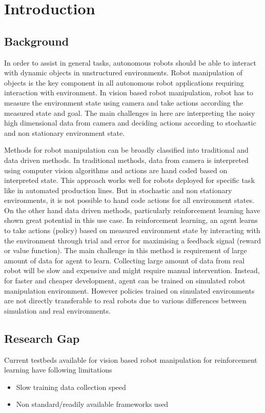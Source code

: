 \chapter{Introduction}

\section{Background}
In order to assist in general tasks, autonomous robots should be able to interact with dynamic objects in unstructured environments. Robot manipulation of objects is the key component in all autonomous robot applications requiring interaction with environment. In vision based robot manipulation, robot has to measure the environment state using camera and take actions according the measured state and goal. The main challenges in here are interpreting the noisy high dimensional data from camera and deciding actions according to stochastic and non stationary environment state.

Methods for robot manipulation can be broadly classified into traditional and data driven methods. In traditional methods, data from camera is interpreted using computer vision algorithms and actions are hand coded based on interpreted state. This approach works well for robots deployed for specific task like in automated production lines. But in stochastic and non stationary environments, it is not possible to hand code actions for all environment states. On the other hand data driven methods, particularly reinforcement learning have shown great potential in this use case. In reinforcement learning, an agent learns to take actions (policy) based on measured environment state by interacting with the environment through trial and error for maximising a feedback signal (reward or value function). The main challenge in this method is requirement of large amount of data for agent to learn. Collecting large amount of data from real robot will be slow and expensive and might require manual intervention. Instead, for faster and cheaper development, agent can be trained on simulated robot manipulation environment. However policies trained on simulated environments are not directly transferable to real robots due to various differences between simulation and real environments.

\section{Research Gap}
Current testbeds available for vision based robot manipulation for reinforcement learning have following limitations
\begin{itemize}
	\item Slow training data collection speed
	\item Non standard/readily available frameworks used
\end{itemize}

